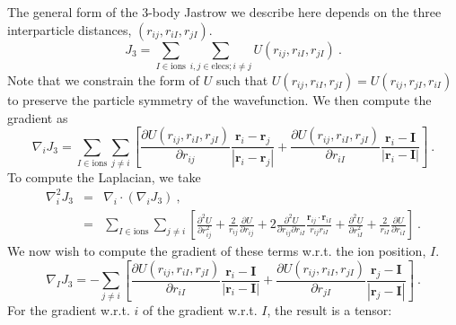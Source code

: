 \newcommand{\riI}{r_{iI}}
\newcommand{\briI}{\mathbf{r}_{iI}}
\newcommand{\rjI}{r_{jI}}
\newcommand{\brjI}{\mathbf{r}_{jI}}
\newcommand{\rij}{r_{ij}}
\newcommand{\brij}{\mathbf{r}_{ij}}
The general form of the 3-body Jastrow we describe here depends on the
three interparticle distances, $(\rij, \riI, \rjI)$.
\begin{equation}
J_3 = \sum_{I\in\text{ions}} \sum_{i,j \in\text{elecs};i\neq j} U(\rij, \riI,
\rjI)\:.
\end{equation}
Note that we constrain the form of $U$ such that
$U(\rij, \riI,\rjI) = U(\rij, \rjI,\riI)$ to preserve the
particle symmetry of the wavefunction.  We then compute the gradient as
\begin{equation}
\nabla_i J_3 =  \sum_{I\in\text{ions}} \sum_{j \neq i}
\left[\frac{\partial U(\rij, \riI,\rjI)}{\partial\rij}
  \frac{\mathbf{r}_i - \mathbf{r}_j}{|\mathbf{r}_i - \mathbf{r}_j|} 
+ \frac{\partial U(\rij, \riI,\rjI)}{\partial\riI}
  \frac{\mathbf{r}_i - \mathbf{I}}{|\mathbf{r}_i - \mathbf{I}|}  \right]\:.
\end{equation}
To compute the Laplacian, we take
\begin{eqnarray}
\nabla_i^2 J_3 & = & \nabla_i \cdot \left(\nabla_i J_3\right)\:, \\
& = & \sum_{I\in\text{ions}} \sum_{j\neq i } \left[
\frac{\partial^2 U}{\partial \rij^2} + \frac{2}{\rij} \frac{\partial
  U}{\partial \rij} + 2 \frac{\partial^2 U}{\partial \rij \partial
  \riI}\frac{\brij\cdot\briI}{\rij\riI} +\frac{\partial^2 U}{\partial
  \riI^2}
+ \frac{2}{\riI}\frac{\partial U}{\partial \riI} \nonumber
\right]\:.
\end{eqnarray}
We now wish to compute the gradient of these terms w.r.t. the ion position, $I$.
\begin{equation}
\nabla_I J_3 = -\sum_{j\neq i} \left[ \frac{\partial U(\rij, \riI,\rjI)}{\partial\riI}
  \frac{\mathbf{r}_i - \mathbf{I}}{|\mathbf{r}_i - \mathbf{I}|} 
+\frac{\partial U(\rij, \riI,\rjI)}{\partial\rjI}
  \frac{\mathbf{r}_j - \mathbf{I}}{|\mathbf{r}_j - \mathbf{I}|} \right]\:.
\end{equation}
For the gradient w.r.t. $i$ of the gradient w.r.t. $I$, the result is a tensor:
